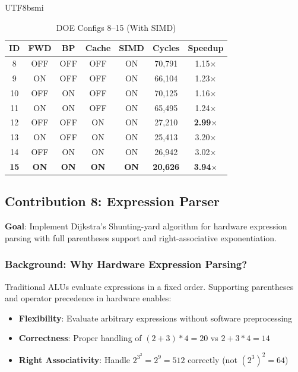 \documentclass[journal,twoside]{IEEEtran}
\begin{document}
\begin{CJK}{UTF8}{bsmi}
\begin{table}[!tbp]
\centering
\caption{DOE Configs 8--15 (With SIMD)}
\label{tab:doe16b}
\footnotesize
\setlength{\tabcolsep}{3pt}
\begin{tabular}{@{}ccccccc@{}}
\toprule
\textbf{ID} & \textbf{FWD} & \textbf{BP} & \textbf{Cache} & \textbf{SIMD} & \textbf{Cycles} & \textbf{Speedup} \\
\midrule
8 & OFF & OFF & OFF & ON & 70,791 & 1.15$\times$ \\
9 & ON & OFF & OFF & ON & 66,104 & 1.23$\times$ \\
10 & OFF & ON & OFF & ON & 70,125 & 1.16$\times$ \\
11 & ON & ON & OFF & ON & 65,495 & 1.24$\times$ \\
12 & OFF & OFF & ON & ON & 27,210 & \textbf{2.99$\times$} \\
13 & ON & OFF & ON & ON & 25,413 & 3.20$\times$ \\
14 & OFF & ON & ON & ON & 26,942 & 3.02$\times$ \\
\textbf{15} & \textbf{ON} & \textbf{ON} & \textbf{ON} & \textbf{ON} & \textbf{20,626} & \textbf{3.94$\times$} \\
\bottomrule
\end{tabular}
\end{table}

\FloatBarrier  %
\subsection{Contribution 8: Expression Parser}

\textbf{Goal}: Implement Dijkstra's Shunting-yard algorithm for hardware expression parsing with full parentheses support and right-associative exponentiation.

\subsubsection{Background: Why Hardware Expression Parsing?}
Traditional ALUs evaluate expressions in a fixed order. Supporting parentheses and operator precedence in hardware enables:
\begin{itemize}
    \item \textbf{Flexibility}: Evaluate arbitrary expressions without software preprocessing
    \item \textbf{Correctness}: Proper handling of $(2+3)*4 = 20$ vs $2+3*4 = 14$
    \item \textbf{Right Associativity}: Handle $2^{3^2} = 2^9 = 512$ correctly (not $(2^3)^2 = 64$)
\end{itemize}


\end{CJK}
\end{document}

